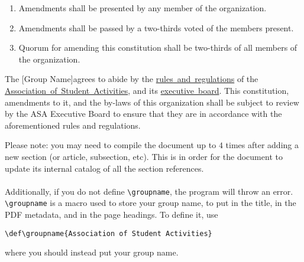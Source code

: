 \documentclass{constitution}
\def\groupname{[Group Name]}
\begin{document}
\begin{enumerate}
    \item Amendments shall be presented by any member of the organization.

    \item Amendments shall be passed by a two-thirds voted of the members present.

    \item Quorum for amending this constitution shall be two-thirds of all members of the organization.
\end{enumerate}

The \groupname agrees to abide by the \href{https://asa.mit.edu/asa-policies}{rules~and~regulations} of the \href{https://asa.mit.edu/}{Association~of~Student~Activities}, and its \href{https://asa.mit.edu/about-asa/board-members}{executive~board}.
This constitution, amendments to it, and the by-laws of this organization shall be subject to review by the ASA Executive Board to ensure that they are in accordance with the aforementioned rules and regulations.



Please note: you may need to compile the document up to $ 4 $ times after adding a new
section (or article, subsection, etc).
This is in order for the document to update its internal catalog of all the section references.
\\\\
Additionally, if you do not define \verb|\groupname|, the program will throw an error.
\verb|\groupname| is a macro used to store your group name, to put in the title, in the PDF metadata, and in the page headings.
To define it, use\par
\quad \verb|\def\groupname{Association of Student Activities}|\par
where you should instead put your group name.
\end{document}
